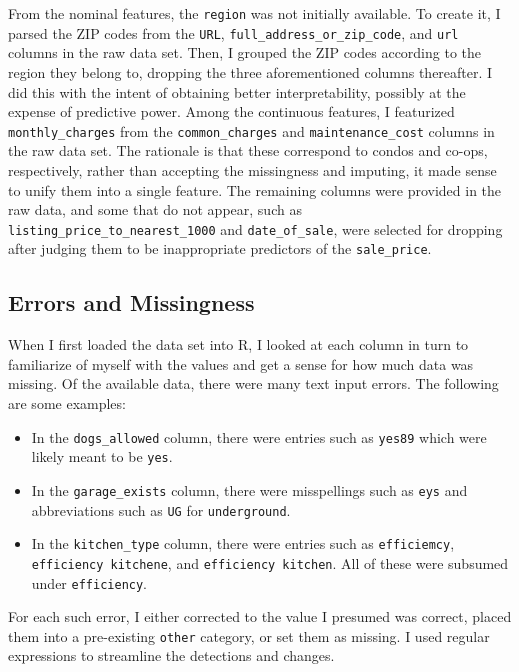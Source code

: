 \documentclass[11pt]{article}
\begin{document}
	From the nominal features, the \verb|region| was not initially available. To
	create it, I parsed the ZIP codes from the \verb|URL|, \verb|full_address_or_zip_code|,
	and \verb|url| columns in the raw data set. Then, I grouped
	the ZIP codes according to the region they belong to, dropping the three
	aforementioned columns thereafter. I did this with the intent
	of obtaining better interpretability, possibly at the expense of predictive power.
	Among the continuous features, I featurized \verb|monthly_charges| from the
	\verb|common_charges| and \verb|maintenance_cost| columns in the raw data set.
	The rationale is that these correspond to condos and co-ops, respectively,
	rather than accepting the missingness and imputing, it made sense to unify
	them into a single feature. The remaining columns were provided in the raw
	data, and some that do not appear, such as \verb|listing_price_to_nearest_1000|
	and \verb|date_of_sale|, were selected for dropping after judging them
	to be inappropriate predictors of the \verb|sale_price|.
	
	\subsection{Errors and Missingness}
	When I first loaded the data set into R, I looked at each column in turn
	to familiarize of myself with the values and get a sense for how much
	data was missing. Of the available data, there were many text input errors.
	The following are some examples:
	\begin{itemize}
		\item In the \verb|dogs_allowed| column, there were entries such as
		\verb|yes89| which were likely meant to be \verb|yes|.
		\item In the \verb|garage_exists| column, there were misspellings
		such as \verb|eys| and abbreviations such as \verb|UG| for \verb|underground|.
		\item In the \verb|kitchen_type| column, there were entries such as
		\verb|efficiemcy|, \verb|efficiency kitchene|, and
		 \verb|efficiency kitchen|. All of these were subsumed under
		 \verb|efficiency|.
	\end{itemize}
	For each such error, I either corrected to the value I presumed was correct,
	placed them into a pre-existing \verb|other| category, or set them as missing.
	I used regular expressions to streamline the detections and changes.
	
\end{document}
